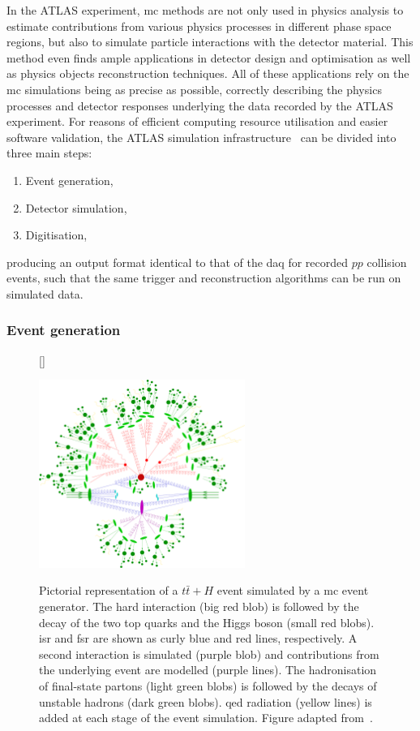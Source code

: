 In the ATLAS experiment, \gls{mc} methods are not only used in physics analysis to estimate contributions from various physics processes in different phase space regions, but also to simulate particle interactions with the detector material. This method even finds ample applications in detector design and optimisation as well as physics objects reconstruction techniques. All of these applications rely on the \gls{mc} simulations being as precise as possible, \ie correctly describing the physics processes and detector responses underlying the data recorded by the ATLAS experiment. For reasons of efficient computing resource utilisation and easier software validation, the ATLAS simulation infrastructure~\cite{Aad:2010ah} can be divided into three main steps:
\begin{enumerate}[label=(\roman*)]	
	\item Event generation,
	\item Detector simulation,
	\item Digitisation,
\end{enumerate}  
producing an output format identical to that of the \gls{daq} for recorded $pp$ collision events, such that the same trigger and reconstruction algorithms can be run on simulated data.

\subsubsection{Event generation}


\begin{figure}
[\FBwidth]
{\caption{Pictorial representation of a $t\bar{t}+H$ event simulated by a \gls{mc} event generator. The hard interaction (big red blob) is followed by the decay of the two top quarks and the Higgs boson (small red blobs). \gls{isr} and \gls{fsr} are shown as curly blue and red lines, respectively. A second interaction is simulated (purple blob) and contributions from the underlying event are modelled (purple lines). The hadronisation of final-state partons (light green blobs) is followed by the decays of unstable hadrons (dark green blobs). \gls{qed} radiation (yellow lines) is added at each stage of the event simulation. Figure adapted from~\cite{Gleisberg:2008ta}.}\label{fig:sherpa_event}}
{\includegraphics[width=0.6\textwidth]{sherpa_event}}
\end{figure}


